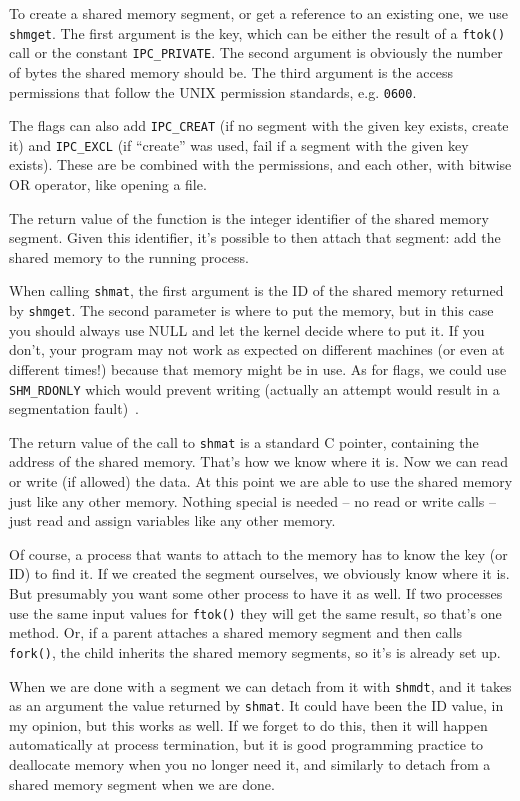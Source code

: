 To create a shared memory segment, or get a reference to an existing one, we use \texttt{shmget}. The first argument is the key, which can be either the result of a \texttt{ftok()} call or the constant \texttt{IPC\_PRIVATE}. The second argument is obviously the number of bytes the shared memory should be. The third argument is the access permissions that follow the UNIX permission standards, e.g. \texttt{0600}.

The flags can also add \texttt{IPC\_CREAT} (if no segment with the given key exists, create it) and \texttt{IPC\_EXCL} (if ``create'' was used, fail if a segment with the given key exists). These are be combined with the permissions, and each other, with bitwise OR operator, like opening a file.

The return value of the function is the integer identifier of the shared memory segment. Given this identifier, it's possible to then attach that segment: add the shared memory to the running process.

When calling \texttt{shmat}, the first argument is the ID of the shared memory returned by \texttt{shmget}. The second parameter is where to put the memory, but in this case you should always use NULL and let the kernel decide where to put it. If you don't, your program may not work as expected on different machines (or even at different times!) because that memory might be in use. As for flags, we could use \texttt{SHM\_RDONLY} which would prevent writing (actually an attempt would result in a segmentation fault)~\cite{lpi}.

The return value of the call to \texttt{shmat} is a standard C pointer, containing the address of the shared memory. That's how we know where it is. Now we can read or write (if allowed) the data. At this point we are able to use the shared memory just like any other memory. Nothing special is needed -- no read or write calls -- just read and assign variables like any other memory.

Of course, a process that wants to attach to the memory has to know the key (or ID) to find it. If we created the segment ourselves, we obviously know where it is. But presumably you want some other process to have it as well. If two processes use the same input values for \texttt{ftok()} they will get the same result, so that's one method. Or, if a parent attaches a shared memory segment and then calls \texttt{fork()}, the child inherits the shared memory segments, so it's is already set up.

When we are done with a segment we can detach from it with \texttt{shmdt}, and it takes as an argument the value returned by \texttt{shmat}. It could have been the ID value, in my opinion, but this works as well. If we forget to do this, then it will happen automatically at process termination, but it is good programming practice to deallocate memory when you no longer need it, and similarly to detach from a shared memory segment when we are done.

